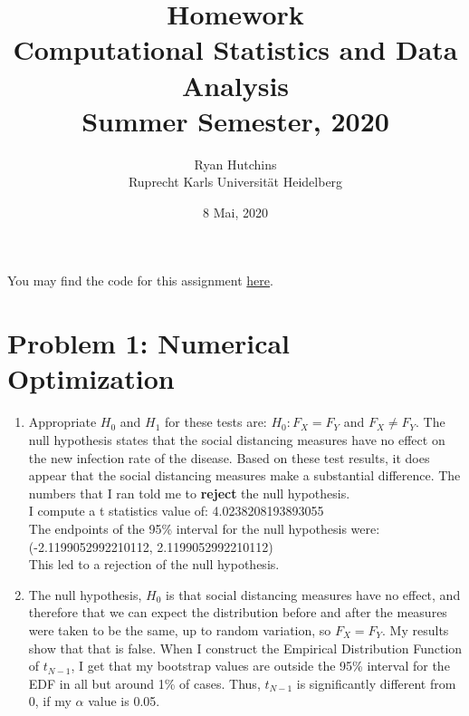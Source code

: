 \documentclass[a4paper,12pt]{article}
\title{
	Homework  \\
	\large Computational Statistics and Data Analysis \\
	\large Summer Semester, 2020
	}
\author{Ryan Hutchins \\ 
Ruprecht Karls Universit\"at Heidelberg}
\date{8 Mai, 2020}
\begin{document}
\maketitle

You may find the code for this assignment \href{https://github.com/GoliathMarks/Computational_Statistics/tree/master/CompStatsHomeworkFive}{here}.

\section{Problem 1: Numerical Optimization}
\begin{enumerate}
\item Appropriate $H_{0}$ and $H_{1}$ for these tests are: $H_{0}: F_{X} = F_{Y}$ and $F_{X} \neq F_{Y}$. The null hypothesis states that the social distancing measures have no effect on the new infection rate of the disease. Based on these test results, it does appear that the social distancing measures make a substantial difference. The numbers that I ran told me to \textbf{reject} the null hypothesis. \\

I compute a t statistics value of: 4.0238208193893055 \\
The endpoints of the 95\% interval for the null hypothesis were: (-2.1199052992210112, 2.1199052992210112) \\

This led to a rejection of the null hypothesis.

\item The null hypothesis, $H_{0}$ is that social distancing measures have no effect, and therefore that we can expect the distribution before and after the measures were taken to be the same, up to random variation, so $F_{X} = F_{Y}$. My results show that that is false. When I construct the Empirical Distribution Function of $t_{N-1}$, I get that my bootstrap values are outside the 95\% interval for the EDF in all but around 1\% of cases. Thus, $t_{N-1}$ is significantly different from 0, if my $\alpha$ value is 0.05.
\end{enumerate}
\end{document}
